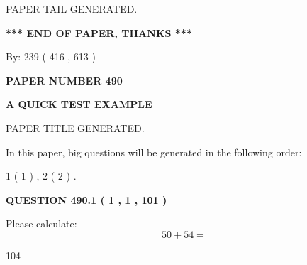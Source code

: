 \documentclass[12pt]{article}
\begin{document}
   
   
   
   
   
 \vspace{0.2in}
 
   
   
\vspace{2.0in} PAPER TAIL GENERATED.
   
   
   
   
\vspace{1.0in} 
{\textbf{\large{ *** END OF PAPER, THANKS *** }}} 
   
   
\hspace{1.0in} By: 
 239 ( 416 ,  613 )
   
   
   
   
\newpage 
\setcounter{page}{ 
   490001 } 
   
   
   
   
 {\textbf{ \Large{ PAPER NUMBER  490  }}}
   
   
\vspace{0.2in}
   
   
   
   
   
   
   
   
 \vspace{0.2in}
{\LARGE {\textbf{ A QUICK TEST EXAMPLE}}}
   
   
 PAPER TITLE GENERATED.
   
   
   
\vspace{0.2in}
   
In this paper, big questions will be generated in the following order: 
   
   
   1 ( 1 )
 ,
   2 ( 2 )
 .
  
\vspace{0.2in}
  
{\textbf{\Large{QUESTION
490.1 
 ( 1 , 1 , 101 )
}}}
  
  
 
Please calculate:
\begin{equation}
50 +  %
54 = \nonumber
\end{equation}
 
 
 
\noindent{}
 
 

104
 
\end{document}
